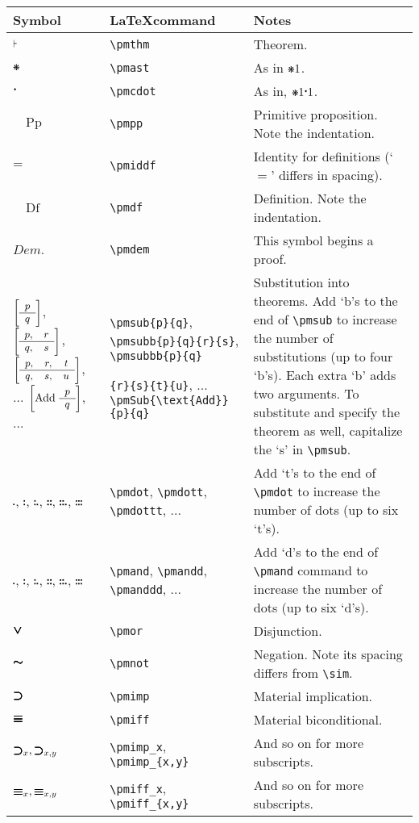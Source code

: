 \documentclass[12pt]{article}
\newcommand{\pmdem}{\textit{Dem}.} %
\newcommand{\pmsub}[2]{\bigg \lbrack \small \begin{array}{c} #1 \\ \hline #2 \end{array} \bigg \rbrack} %
\newcommand{\pmsubb}[4]{\bigg \lbrack \small \begin{array}{c c} #1, & #3 \\ \hline #2, & #4 \end{array}  \bigg \rbrack} %
\newcommand{\pmsubbb}[6]{\bigg \lbrack \small \begin{array}{c c c} #1, & #3, & #5 \\ \hline #2, & #4, & #6 \end{array}  \bigg \rbrack} %
\newcommand{\pmSub}[3]{\bigg \lbrack \normalsize #1 \text{ } \small \begin{array}{c} #2 \\ \hline #3 \end{array}  \bigg \rbrack} %
\newcommand{\pmthm}{\mathpunct{\text{\scalebox{.5}[1]{$\boldsymbol\vdash$}}}} %
\newcommand{\pmast}{\text{\resizebox{!}{.75\height}{\ding{107}}}} %
\newcommand{\pmcdot}{\text{\raisebox{.05cm}{$\boldsymbol\cdot$}}} %
\newcommand{\pmiddf}{\mathbin{=}}
\newcommand{\pmdf}{\quad \text{Df}}
\newcommand{\pmpp}{\quad \text{Pp}}
\newcommand{\pmdot}{\mathrel{\hbox{\rule{.3ex}{.3ex}}}}
\newcommand{\pmdott}{\mathrel{\overset{\pmdot}{\pmdot}}}
\newcommand{\pmdottt}{\pmdott\hspace{.1em}\pmdot}
\newcommand{\pmdotttt}{\pmdott\hspace{.1em}\pmdott}
\newcommand{\pmdottttt}{\pmdott\hspace{.1em}\pmdott\hspace{.1em}\pmdot}
\newcommand{\pmdotttttt}{\pmdott\hspace{.1em}\pmdott\hspace{.1em}\pmdott}
\newcommand{\pmnot}{\mathord{\ooalign{$\boldsymbol{\sim}\mkern.5mu$\hidewidth\cr$\boldsymbol{\sim}$\cr\hidewidth$\mkern.5mu\boldsymbol{\sim}$}}}
\newcommand{\pmor}{\mathbin{\ooalign{$\boldsymbol{\vee}\mkern.5mu$\hidewidth\cr$\boldsymbol{\vee}$\cr\hidewidth$\mkern.5mu\boldsymbol{\vee}$}}}
\newcommand{\pmimp}{\mathbin{\ooalign{$\boldsymbol{\supset}\mkern.5mu$\hidewidth\cr$\boldsymbol{\supset}$\cr\hidewidth$\mkern.5mu\boldsymbol{\supset}$}}} %
\newcommand{\pmand}{\mathrel{\hbox{\rule{.3ex}{.3ex}}}} %
\newcommand{\pmandd}{\overset{\pmand}{\pmand}}
\newcommand{\pmanddd}{\pmandd\hspace{.1em}\pmand}
\newcommand{\pmandddd}{\pmandd\hspace{.1em}\pmandd}
\newcommand{\pmanddddd}{\pmandd\hspace{.1em}\pmandd\hspace{.1em}\pmand}
\newcommand{\pmandddddd}{\pmandd\hspace{.1em}\pmandd\hspace{.1em}\pmandd}
\newcommand{\pmiff}{\mathbin{\ooalign{$\boldsymbol{\equiv}\mkern.5mu$\hidewidth\cr$\boldsymbol{\equiv}$\cr\hidewidth$\mkern.5mu\boldsymbol{\equiv}$}}} %
\begin{document}
\noindent \begin{tabular}{@{}p{3cm} | p{5cm} | p{8.25cm}}
	\textbf{Symbol} & \textbf{\LaTeX command} & \textbf{Notes} \\ \hline
	$\pmthm$ & \verb|\pmthm| & Theorem. \\
	$\pmast$ & \verb|\pmast| & As in $\pmast1$.  \\ 
	$\pmcdot$ & \verb|\pmcdot| & As in, $\pmast1\pmcdot1$. \\
	$\pmpp$ & \verb|\pmpp| & Primitive proposition. Note the indentation. \\
	$\pmiddf$ & \verb|\pmiddf| & Identity for definitions (`$=$' differs in spacing).  \\
	$\pmdf$ & \verb|\pmdf| & Definition. Note the indentation.  \\
	$\pmdem$ & \verb|\pmdem| & This symbol begins a proof. \\  
	$\pmsub{p}{q}$, $\pmsubb{p}{q}{r}{s}$, $\pmsubbb{p}{q}{r}{s}{t}{u}$, ... $\pmSub{\text{Add}}{p}{q}$, ... & \verb|\pmsub{p}{q}|, \verb|\pmsubb{p}{q}{r}{s}|, \verb|\pmsubbb{p}{q}| \par \hfill \verb|{r}{s}{t}{u}|, ... \verb|\pmSub{\text{Add}}{p}{q}| & Substitution into theorems. Add `b's to the end of \verb|\pmsub| to increase the number of substitutions (up to four `b's). Each extra `b' adds two arguments. To substitute and specify the theorem as well, capitalize the `s' in \verb|\pmsub|. \\
	$\pmdot$, $\pmdott$, $\pmdottt$, $\pmdotttt$, $\pmdottttt$, $\pmdotttttt$ & \verb|\pmdot|, \verb|\pmdott|, \verb|\pmdottt|, ... & Add `t's to the end of \verb|\pmdot| to increase the number of dots (up to six `t's). \\ 
	$\pmand$, $\pmandd$, $\pmanddd$, $\pmandddd$, $\pmanddddd$, $\pmandddddd$ & \verb|\pmand|, \verb|\pmandd|, \verb|\pmanddd|, ...& Add `d's to the end of \verb|\pmand| command to increase the number of dots (up to six `d's). \\ 
	$\pmor$ & \verb|\pmor| & Disjunction. \\
	$\pmnot$ & \verb|\pmnot| & Negation. Note its spacing differs from \verb|\sim|. \\
	$\pmimp$ & \verb|\pmimp| & Material implication. \\
	$\pmiff$ & \verb|\pmiff| & Material biconditional. \\
	$\pmimp_x, \pmimp_{x,y}$ & \verb|\pmimp_x|, \verb|\pmimp_{x,y}| & And so on for more subscripts. \\
	$\pmiff_x, \pmiff_{x,y}$ & \verb|\pmiff_x|, \verb|\pmiff_{x,y}| & And so on for more subscripts. \\

\end{tabular}
\end{document}

